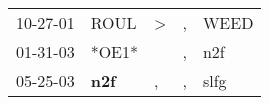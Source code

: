 \begin{supertabular}{p{0.07\textwidth}p{0.06\textwidth}p{0.02\textwidth}p{0.02\textwidth}p{0.06\textwidth}}
 10-27-01\textsuperscript{} &          ROUL\textsuperscript{} &  \textgreater &  , &  WEED\textsuperscript{} \\
 01-31-03\textsuperscript{} &                           *OE1* &               &  , &   n2f\textsuperscript{} \\
 05-25-03\textsuperscript{} &  \textbf{n2f\textsuperscript{}} &             , &  , &  slfg\textsuperscript{} \\
\end{supertabular}
